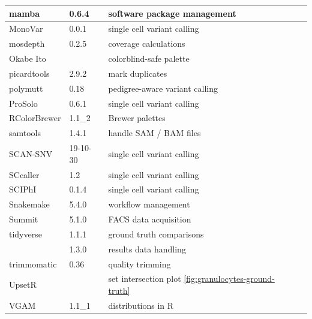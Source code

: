 \documentclass[authoryear,preprint,11pt]{scrartcl}
\begin{document}
\begin{center}
\begin{table}[tbp]
\begin{tabular}{llll}
    \midrule
    mamba               & 0.6.4     & software package management   &  \\
    \midrule
    MonoVar             & 0.0.1     & single cell variant calling   & \citep{zafar_monovar:_2016} \\
    \midrule
    mosdepth            & 0.2.5     & coverage calculations         & \citep{pedersen_mosdepth_2018} \\
    \midrule
    Okabe Ito           &           & colorblind-safe palette       & \citep{okabe_color_2008} \\
    \midrule
    picardtools         & 2.9.2     & mark duplicates               &  \\
    \midrule
    polymutt           & 0.18      & pedigree-aware variant calling & \citep{li_likelihood-based_2012} \\
    \midrule
    ProSolo             & 0.6.1     & single cell variant calling        &  \\
    \midrule
    RColorBrewer        & 1.1\_2    & Brewer palettes              & \citep{neuwirth_rcolorbrewer_2014} \\
    \midrule
    samtools            & 1.4.1     & handle SAM / BAM files        & \citep{li_sequence_2009} \\
    \midrule
    SCAN-SNV            & 19-10-30 & single cell variant calling  & \citep{luquette_identification_2019} \\
    \midrule
    SCcaller            & 1.2       & single cell variant calling  & \citep{dong_accurate_2017} \\
    \midrule
    SCIPhI              & 0.1.4     & single cell variant calling  & \citep{singer_single-cell_2018} \\
    \midrule
    Snakemake           & 5.4.0     & workflow management           & \citep{koster_snakemakescalable_2012} \\
    \midrule
    Summit              & 5.1.0     & FACS data acquisition         & \\
    \midrule
    tidyverse           & 1.1.1     & ground truth comparisons      & \citep{wickham_welcome_2019} \\
                        & 1.3.0     & results data handling         &  \\
    \midrule
    trimmomatic         & 0.36      & quality trimming              & \citep{bolger_trimmomatic_2014} \\
    \midrule
    UpsetR              &           & set intersection plot \ref{fig:granulocytes-ground-truth} & \citep{conway_upsetr_2017} \\
    \midrule
    VGAM                & 1.1\_1     & distributions in R            & \citep{yee_vgam_2008,yee_vector_2015} \\
    \bottomrule
  \end{tabular}
 \end{table}
\end{center}




\end{document}
